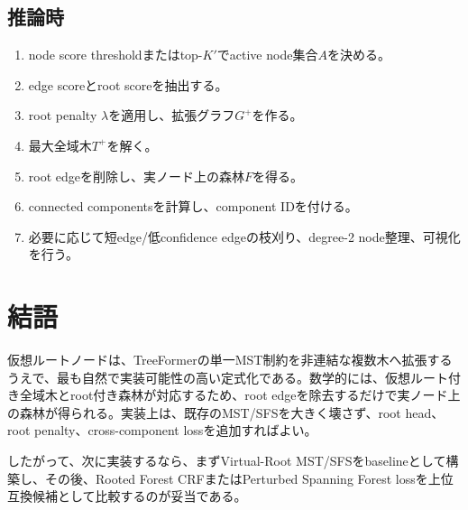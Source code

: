 \documentclass[11pt,a4paper]{article}
\begin{document}
\subsection{推論時}
\begin{enumerate}
  \item node score thresholdまたはtop-$K'$でactive node集合$A$を決める。
  \item edge scoreとroot scoreを抽出する。
  \item root penalty $\lambda$を適用し、拡張グラフ$G^+$を作る。
  \item 最大全域木$T^+$を解く。
  \item root edgeを削除し、実ノード上の森林$F$を得る。
  \item connected componentsを計算し、component IDを付ける。
  \item 必要に応じて短edge/低confidence edgeの枝刈り、degree-2 node整理、可視化を行う。
\end{enumerate}

\section{結語}
仮想ルートノードは、TreeFormerの単一MST制約を非連結な複数木へ拡張するうえで、最も自然で実装可能性の高い定式化である。数学的には、仮想ルート付き全域木とroot付き森林が対応するため、root edgeを除去するだけで実ノード上の森林が得られる。実装上は、既存のMST/SFSを大きく壊さず、root head、root penalty、cross-component lossを追加すればよい。

したがって、次に実装するなら、まずVirtual-Root MST/SFSをbaselineとして構築し、その後、Rooted Forest CRFまたはPerturbed Spanning Forest lossを上位互換候補として比較するのが妥当である。
\end{document}
